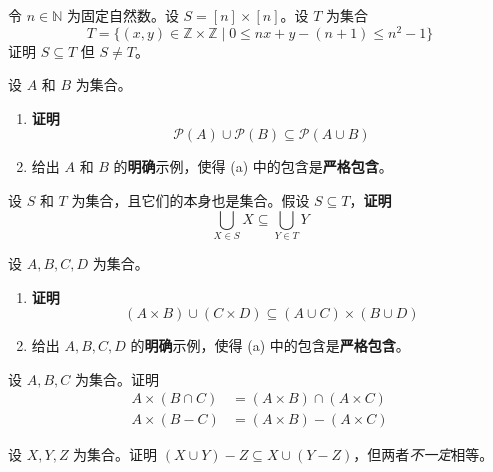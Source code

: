 \begin{exercise}
    令 $n \in \mathbb{N}$ 为固定自然数。设 $S = [n] \times [n]$。设 $T$ 为集合
    \[T =\Big\{(x, y) \in \mathbb{Z} \times \mathbb{Z} \mid 0 \le nx + y - (n + 1) \le n^2 - 1\Big\}\]
    证明 $S \subseteq T$ 但 $S \ne T$。
\end{exercise}

\begin{exercise}
    设 $A$ 和 $B$ 为集合。
    \begin{enumerate}[label=(\alph*)]
        \item \textbf{证明} 
        \[\mathcal{P}(A) \cup \mathcal{P}(B) \subseteq \mathcal{P}(A \cup B)\]
        \item 给出 $A$ 和 $B$ 的\textbf{明确}示例，使得 (a) 中的包含是\textbf{严格包含}。
    \end{enumerate}
\end{exercise}

\begin{exercise}
    设 $S$ 和 $T$ 为集合，且它们的本身也是集合。假设 $S \subseteq T$，\textbf{证明} 
    \[\bigcup_{X \in S} X \subseteq \bigcup_{Y \in T} Y\]
\end{exercise}

\begin{exercise}
    设 $A, B, C, D$ 为集合。
    \begin{enumerate}[label=(\alph*)]
        \item \textbf{证明} 
        \[(A \times B) \cup (C \times D) \subseteq (A \cup C) \times (B \cup D)\]
        \item 给出 $A,B,C,D$ 的\textbf{明确}示例，使得 (a) 中的包含是\textbf{严格包含}。
    \end{enumerate}
\end{exercise}

\begin{exercise}
    设 $A, B, C$ 为集合。证明
    \begin{align*}
        A \times (B \cap C) &= (A \times B) \cap (A \times C) \\
        A \times (B - C) &= (A \times B) - (A \times C)
    \end{align*}
\end{exercise}

\begin{exercise}\label{exc:exercises3.11.17} 
    设 $X,Y,Z$ 为集合。证明 $(X \cup Y ) - Z \subseteq X \cup (Y - Z)$，但两者\emph{不一定}相等。
\end{exercise}

